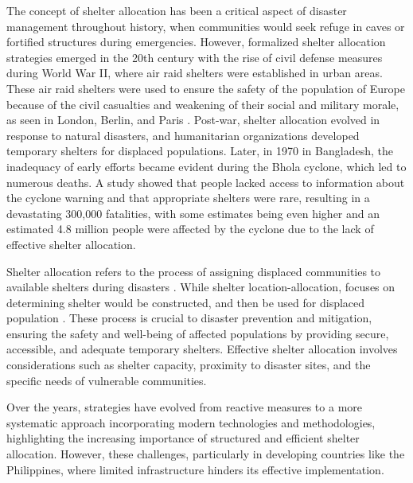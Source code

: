 	The concept of shelter allocation has been a critical aspect of disaster management throughout history, when communities would seek refuge in caves or fortified structures during emergencies. However, formalized shelter allocation strategies emerged in the 20th century with the rise of civil defense measures during World War II, where air raid shelters were established in urban areas. These air raid shelters were used to ensure the safety of the population of Europe because of the civil casualties and weakening of their social and military morale, as seen in London, Berlin, and Paris \parencite{Flebus1941,Shakibamaesh2015}. Post-war, shelter allocation evolved in response to natural disasters, and humanitarian organizations developed temporary shelters for displaced populations. Later, in 1970 in Bangladesh, the inadequacy of early efforts became evident during the Bhola cyclone, which led to numerous deaths. A study showed that people lacked access to information about the cyclone warning and that appropriate shelters were rare, resulting in a devastating 300,000 fatalities, with some estimates being even higher and an estimated 4.8 million people were affected by the cyclone due to the lack of effective shelter allocation. \parencite{Mari2020}
	
	Shelter allocation refers to the process of assigning displaced communities to available shelters during disasters \parencite{Yin2023}. While shelter location-allocation,  focuses on determining shelter would be constructed, and then be used for displaced population \parencite{Xiujuan2019}. These process is crucial to disaster prevention and mitigation, ensuring the safety and well-being of affected populations by providing secure, accessible, and adequate temporary shelters. Effective shelter allocation involves considerations such as shelter capacity, proximity to disaster sites, and the specific needs of vulnerable communities. 
	
	Over the years, strategies have evolved from reactive measures to a more systematic approach incorporating modern technologies and methodologies, highlighting the increasing importance of structured and efficient shelter allocation. However, these challenges, particularly in developing countries like the Philippines, where limited infrastructure hinders its effective implementation.
	

